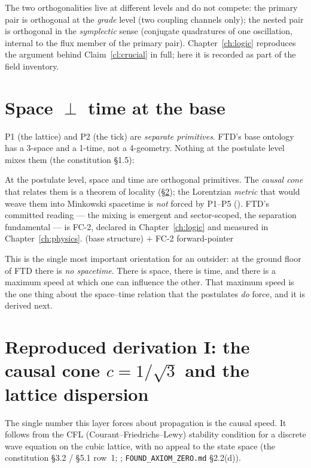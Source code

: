 \noindent The two orthogonalities live at different levels and do not compete: the
primary pair is orthogonal at the \emph{grade} level (two coupling channels only);
the nested pair is orthogonal in the \emph{symplectic} sense (conjugate
quadratures of one oscillation, internal to the flux member of the primary pair).
Chapter~\ref{ch:logic} reproduces the argument behind Claim~\ref{cl:crucial} in
full; here it is recorded as part of the field inventory.

\section{Space \texorpdfstring{$\perp$}{perp} time at the base}\label{sec:spaceperptime}

P1 (the lattice) and P2 (the tick) are \emph{separate primitives}. FTD's base
ontology has a 3-space and a 1-time, not a 4-geometry. Nothing at the postulate
level mixes them (the constitution \S1.5):

\begin{claim}\label{cl:spaceperptime}
At the postulate level, space and time are orthogonal primitives. The
\emph{causal cone} that relates them is a theorem of locality
(\S\ref{sec:causalcone}); the Lorentzian \emph{metric} that would weave them into
Minkowski spacetime is \emph{not} forced by P1--P5 (). FTD's committed
reading --- the mixing is emergent and sector-scoped, the separation fundamental
--- is FC-2, declared in Chapter~\ref{ch:logic} and measured in
Chapter~\ref{ch:physics}. \;(base structure) $+$ FC-2 forward-pointer
\end{claim}

This is the single most important orientation for an outsider: at the ground floor
of FTD there is \emph{no spacetime}. There is space, there is time, and there is a
maximum speed at which one can influence the other. That maximum speed is the one
thing about the space--time relation that the postulates \emph{do} force, and it
is derived next.

\section{Reproduced derivation I: the causal cone \texorpdfstring{$c=1/\sqrt3$}{c=1/sqrt3} and the lattice dispersion}\label{sec:causalcone}

The single number this layer forces about propagation is the causal speed. It
follows from the CFL (Courant--Friedrichs--Lewy) stability condition for a discrete
wave equation on the cubic lattice, with no appeal to the state space (the
constitution \S3.2 / \S5.1 row~1; ; \texttt{FOUND\_AXIOM\_ZERO.md}
\S2.2(d)).

